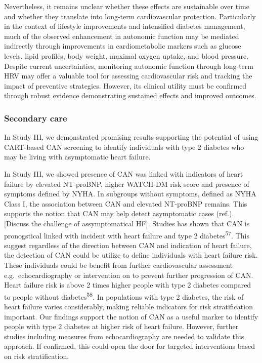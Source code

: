 \documentclass[
  a4paper,
  headsepline=true,
  open=any]{scrbook}
\begin{document}
Nevertheless, it remains unclear whether these effects are sustainable
over time and whether they translate into long-term cardiovascular
protection. Particularly in the context of lifestyle improvements and
intensified diabetes management, much of the observed enhancement in
autonomic function may be mediated indirectly through improvements in
cardiometabolic markers such as glucose levels, lipid profiles, body
weight, maximal oxygen uptake, and blood pressure. Despite current
uncertainties, monitoring autonomic function through long-term HRV may
offer a valuable tool for assessing cardiovascular risk and tracking the
impact of preventive strategies. However, its clinical utility must be
confirmed through robust evidence demonstrating sustained effects and
improved outcomes.

\hypertarget{secondary-care}{%
\subsubsection{Secondary care}\label{secondary-care}}

In Study III, we demonstrated promising results supporting the potential
of using CART-based CAN screening to identify individuals with type 2
diabetes who may be living with asymptomatic heart failure.

In Study III, we showed presence of CAN was linked with indicators of
heart failure by elevated NT-proBNP, higher WATCH-DM risk score and
presence of symptoms defined by NYHA. In subgroups without symptoms,
defined as NYHA Class I, the association between CAN and elevated
NT-proBNP remains. This supports the notion that CAN may help detect
asymptomatic cases (ref.). {[}Discuss the challenge of assymptomatical
HF{]}. Studies has shown that CAN is pronogstical linked with incident
with heart failure and type 2 diabetes\textsuperscript{57}. This suggest
regardless of the direction between CAN and indication of heart failure,
the detection of CAN could be utilize to define individuals with heart
failure risk. These individuals could be benefit from further
cardiovascular assessment e.g.~echocardiography or intervention on to
prevent further progression of CAN. Heart failure risk is above 2 times
higher people with type 2 diabetes compared to people without
diabetes\textsuperscript{58}. In populations with type 2 diabetes, the
risk of heart failure varies considerably, making reliable indicators
for risk stratification important. Our findings support the notion of
CAN as a useful marker to identify people with type 2 diabetes at higher
risk of heart failure. However, further studies including measures from
echocardiography are needed to validate this approach. If confirmed,
this could open the door for targeted interventions based on risk
stratification.
\end{document}
